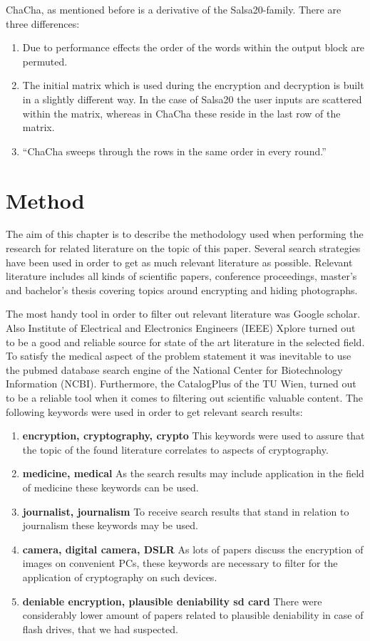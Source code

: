 \documentclass[12pt,a4paper,titlepage,oneside]{scrartcl}
\begin{document}
ChaCha, as mentioned before is a derivative of the Salsa20-family.
There are three differences:
\begin{enumerate}
  \item Due to performance effects the order of the words within the output block are permuted.
  \item The initial matrix which is used during the encryption and decryption is built in a slightly different way.
    In the case of Salsa20 the user inputs are scattered within the matrix, whereas in ChaCha these reside in the last row of the matrix.
  \item ``ChaCha sweeps through the rows in the same order in every round.''
\end{enumerate}
\cite{bernstein2008chacha}

\newpage
\section{Method}
The aim of this chapter is to describe the methodology used when performing the research for related literature on the topic of this paper.
Several search strategies have been used in order to get as much relevant literature as possible.
Relevant literature includes all kinds of scientific papers, conference proceedings, master's and bachelor's thesis covering topics around encrypting and hiding photographs.

The most handy tool in order to filter out relevant literature was Google scholar. 
Also Institute of Electrical and Electronics Engineers (IEEE) Xplore turned out to be a good and reliable source for state of the art literature in the selected field.
To satisfy the medical aspect of the problem statement it was inevitable to use the pubmed database search engine of the National Center for Biotechnology Information (NCBI).
Furthermore, the CatalogPlus of the TU Wien, turned out to be a reliable tool when it comes to filtering out scientific valuable content.
The following keywords were used in order to get relevant search results:
\begin{enumerate}
  \item  \textbf{encryption, cryptography, crypto}
  This keywords were used to assure that the topic of the found literature correlates to aspects of cryptography.
  \item  \textbf{medicine, medical}
  As the search results may include application in the field of medicine these keywords can be used.
  \item  \textbf{journalist, journalism}
  To receive search results that stand in relation to journalism these keywords may be used.
  \item \textbf{camera, digital camera, DSLR}
  As lots of papers discuss the encryption of images on convenient PCs, these keywords are necessary to filter for the application of cryptography on such devices.
  \item \textbf{deniable encryption, plausible deniability sd card}
    There were considerably lower amount of papers related to plausible deniability in case of flash drives, that we had suspected.
\end{enumerate}
\end{document}
